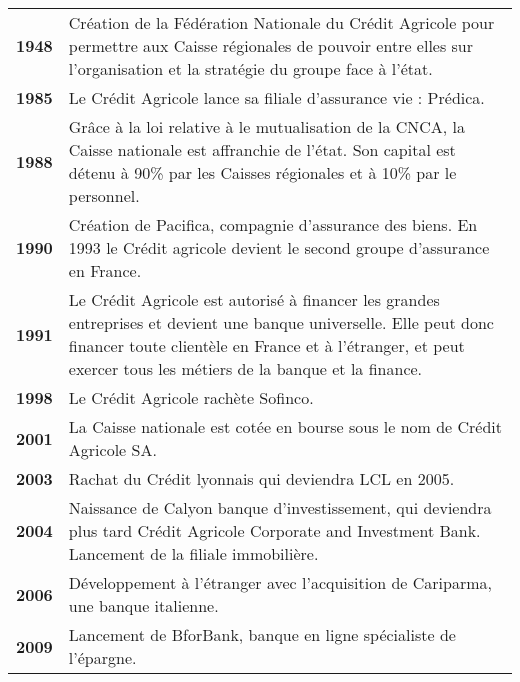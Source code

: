 \documentclass[12pt,a4paper]{article}
\begin{document}
\begin{tabular}{lp{15.5cm}}
\textbf{1948} & Création de la Fédération Nationale du Crédit Agricole pour permettre aux Caisse régionales de pouvoir entre elles sur l'organisation et la stratégie du groupe face à l'état.\medskip \\
\textbf{1985} & Le Crédit Agricole lance sa filiale d'assurance vie : Prédica.\medskip \\
\textbf{1988} & Grâce à la loi relative à le mutualisation de la CNCA, la Caisse nationale est affranchie de l'état. Son capital est détenu à 90\% par les Caisses régionales et à 10\% par le personnel.\medskip \\
\textbf{1990} & Création de Pacifica, compagnie d'assurance des biens. En 1993 le Crédit agricole devient le second groupe d'assurance en France.\medskip \\
\textbf{1991} & Le Crédit Agricole est autorisé à financer les grandes entreprises et devient une banque universelle. Elle peut donc financer toute clientèle en France et à l'étranger, et peut exercer tous les métiers de la banque et la finance.\medskip \\
\textbf{1998} & Le Crédit Agricole rachète Sofinco.\medskip \\
\textbf{2001} & La Caisse nationale est cotée en bourse sous le nom de Crédit Agricole SA.\medskip \\
\textbf{2003} & Rachat du Crédit lyonnais qui deviendra LCL en 2005.\medskip \\
\textbf{2004} & Naissance de Calyon banque d'investissement, qui deviendra plus tard Crédit Agricole Corporate and Investment Bank. Lancement de la filiale immobilière.\medskip \\
\textbf{2006} & Développement à l'étranger avec l'acquisition de Cariparma, une banque italienne.\\
\textbf{2009} & Lancement de BforBank, banque en ligne spécialiste de l'épargne.\medskip \\
\end{tabular}\par
\end{document}
